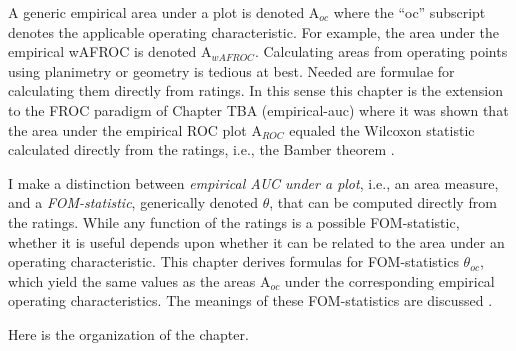 \documentclass[
]{book}
\begin{document}
A generic empirical area under a plot is denoted \(\text{A}_{oc}\) where the ``oc'' subscript denotes the applicable operating characteristic. For example, the area under the empirical wAFROC is denoted \(\text{A}_{wAFROC}\). Calculating areas from operating points using planimetry or geometry is tedious at best. Needed are formulae for calculating them directly from ratings. In this sense this chapter is the extension to the FROC paradigm of Chapter TBA (empirical-auc) where it was shown that the area under the empirical ROC plot \(\text{A}_{ROC}\) equaled the Wilcoxon statistic calculated directly from the ratings, i.e., the Bamber theorem \citep{RN2174}.

I make a distinction between \emph{empirical AUC under a plot}, i.e., an area measure, and a \emph{FOM-statistic}, generically denoted \(\theta\), that can be computed directly from the ratings. While any function of the ratings is a possible FOM-statistic, whether it is useful depends upon whether it can be related to the area under an operating characteristic. This chapter derives formulas for FOM-statistics \(\theta_{oc}\), which yield the same values as the areas \(\text{A}_{oc}\) under the corresponding empirical operating characteristics. The meanings of these FOM-statistics are discussed \citep{RN2484}.

Here is the organization of the chapter.
\end{document}
